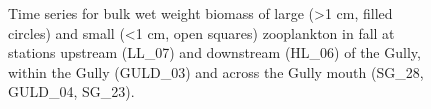 \documentclass[12pt]{article}\usepackage[]{graphicx}\usepackage[]{color}
\begin{document}
\begin{figure}[htb]

{\centering {} 

}

\caption{Time series for bulk wet weight biomass of large (\textgreater1 cm, filled circles) and small (\textless1 cm, open squares) zooplankton in fall at stations upstream (LL\_07) and downstream (HL\_06) of the Gully, within the Gully (GULD\_03) and across the Gully mouth (SG\_28, GULD\_04, SG\_23).}\label{fig:figure30}
\end{figure}
\clearpage
\end{document}
